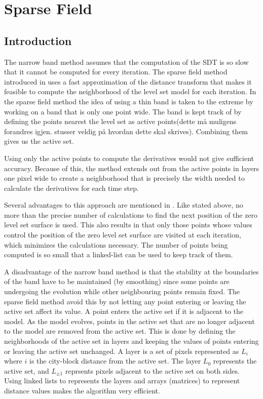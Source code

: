 \chapter{Sparse Field}

\section{Introduction}

The narrow band  method assumes that the computation of the SDT is so slow that it cannot be computed for every iteration. The sparse field method introduced in \cite{whitaker89} uses a fast approximation of the distance transform that makes it feasible to compute the neighborhood of the level set model for each iteration. In the sparse field method the idea of using a thin band is taken to the extreme by working on a band that is only one point wide. The band is kept track of by defining the points nearest the level set as active points(dette må muligens forandres igjen. stusser veldig på hvordan dette skal skrives). Combining them gives us the active set. 

Using only the active points to compute the derivatives would not give sufficient accuracy. Because of this, the method extends out from the active points in layers one pixel wide to create a neighborhood that is precisely the width needed to calculate the derivatives for each time step. 

Several advantages to this approach are mentioned in \cite{whitaker89}. Like stated above, no more than the precise number of calculations to find the next position of the zero level set surface is used. This also results in that only those points whose values control the position of the zero level set surface are visited at each iteration, which minimizes the calculations necessary. The number of points being computed is so small that a linked-list can be used to keep track of them. 





A disadvantage of the narrow band method is that the stability at the boundaries of the band have to be maintained (by smoothing) since some points are undergoing the evolution while other neighbouring points remain fixed. The sparse field method avoid this by not letting any point entering or leaving the active set affect its value. A point enters the active set if it is adjacent to the model. As the model evolves, points in the active set that are no longer adjacent to the model are removed from the active set. This is done by defining the neighborhoods of the active set in layers and keeping the values of points entering or leaving the active set unchanged. A layer is a set of pixels represented as \(L_{i}\) where \(i\) is the city-block distance from the active set. The layer \(L_{0}\) represents the active set, and \(L_{\pm 1}\) reprsents pixels adjacent to the active set on both sides. Using linked lists to represents the layers and arrays (matrices) to represent distance values makes the algorithm very efficient. 

